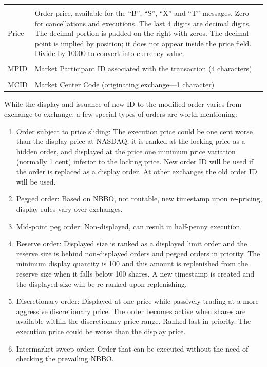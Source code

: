 \begin{table}[!ht]
\begin{tabular}{lp{}}
	& \\
	Price & Order price, available for the ``B'', ``S'', ``X'' and ``T'' messages. \newline Zero for cancellations and executions. The last 4 digits are decimal digits. The decimal portion is padded on the right with zeros. The decimal point is implied by position; it does not appear inside the price field. Divide by 10000 to convert into currency value. \\ 
	& \\
	MPID & Market Participant ID associated with the transaction (4 characters) \\
	& \\
	MCID & Market Center Code (originating exchange---1 character) 
	\end{tabular}
	\end{table}
	

While the display and issuance of new ID to the modified order varies from exchange to exchange, a few special types of orders are worth mentioning:
        \begin{enumerate}[1.]
        \item Order subject to price sliding: The execution price could be one cent worse than the display price at NASDAQ; it is ranked at the locking price as a hidden order, and displayed at the price one minimum price variation (normally 1 cent) inferior to the locking price. New order ID will be used if the order is replaced as a display order. At other exchanges the old order ID will be used.
        \item Pegged order: Based on NBBO, not routable, new timestamp upon re-pricing, display rules vary over exchanges.
        \item Mid-point peg order: Non-displayed, can result in half-penny execution.
        \item Reserve order: Displayed size is ranked as a displayed limit order and the reserve size is behind non-displayed orders and pegged orders in priority. The minimum display quantity is 100 and this amount is replenished from the reserve size when it falls below 100 shares. A new timestamp is created and the displayed size will be re-ranked upon replenishing.
        \item Discretionary order: Displayed at one price while passively trading at a more aggressive discretionary price. The order becomes active when shares are available within the discretionary price range. Ranked last in priority. The execution price could be worse than the display price.
        \item Intermarket sweep order: Order that can be executed without the need of checking the prevailing NBBO.  
        \end{enumerate}


